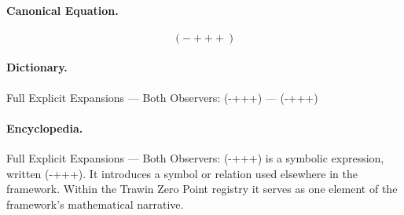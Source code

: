 \paragraph{Canonical Equation.}
\[
(-+++)
\]

\paragraph{Dictionary.}
Full Explicit Expansions — Both Observers: (-+++) — (-+++)

\paragraph{Encyclopedia.}
Full Explicit Expansions — Both Observers: (-+++) is a symbolic expression, written (-+++). It introduces a symbol or relation used elsewhere in the framework. Within the Trawin Zero Point registry it serves as one element of the framework's mathematical narrative.
